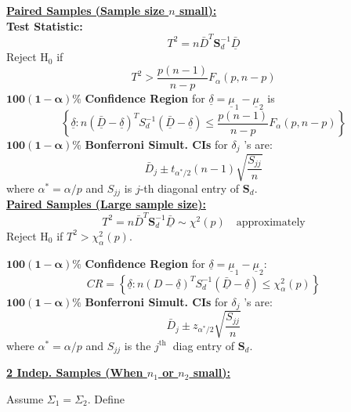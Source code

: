 \documentclass[a4paper]{article}
\begin{document}
\begin{multicols*}{4}
\textbf{\underline{Paired Samples (Sample size $n$ small):}} \\
\textbf{Test Statistic:}
$$
T^2=n \bar{D}^T \boldsymbol{S}_d^{-1} \underline{\bar{D}}
$$
Reject $\mathrm{H}_0$ if
$$
T^2>\frac{p(n-1)}{n-p} F_\alpha(p, n-p)
$$
$\mathbf{100(1-\alpha) \%}$\textbf{ Confidence Region} for $\underline{\delta}=\underline{\mu}_1-\underline{\mu}_2$ is
$$
\left\{\underline{\delta}: n(\underline{\bar{D}}-\underline{\delta})^T S_d^{-1}(\underline{\bar{D}}-\underline{\delta}) \leq \frac{p(n-1)}{n-p} F_\alpha(p, n-p)\right\}
$$
$\mathbf{100(1-\alpha) \%}$ \textbf{Bonferroni Simult. CIs} for $\delta_j$ 's are:
$$
\bar{D}_j \pm t_{\alpha^* / 2}(n-1) \sqrt{\frac{S_{j j}}{n}}
$$
where $\alpha^*=\alpha / p$ and
$S_{j j}$ is $j$-th diagonal entry of $\boldsymbol{S}_d$.
\smallskip \\
\textbf{\underline{Paired Samples (Large sample size):}}
$$
T^2=n \bar{D}^T \boldsymbol{S}_d^{-1} \underline{\bar{D}} \sim \chi^2(p)
\quad \text{approximately}$$
Reject $\mathrm{H}_0$ if $T^2>\chi_\alpha^2(p)$.
\smallskip

$\mathbf{100(1-\alpha) \%}$ \textbf{Confidence Region} for $\underline{\delta}=\underline{\mu}_1-\underline{\mu}_2$:
$$
C R=\left\{\underline{\delta}: n(D-\underline{\delta})^T S_d^{-1}(\underline{\bar{D}}-\underline{\delta}) \leq \chi_\alpha^2(p)\right\}
$$
$\mathbf{100(1-\alpha) \%}$ \textbf{Bonferroni Simult. CIs} for $\delta_j$ 's are:
$$
\bar{D}_j \pm z_{\alpha^* / 2} \sqrt{\frac{S_{j j}}{n}}
$$
where $\alpha^*=\alpha / p$ and $S_{j j}$ is the $j^{\text {th }}$ diag entry of $\boldsymbol{S}_d$.

\textbf{\underline{2 Indep. Samples (When $n_1$ or $n_2$ small):}}

Assume $\Sigma_1 = \Sigma_2$. Define


\end{multicols*}
\end{document}
